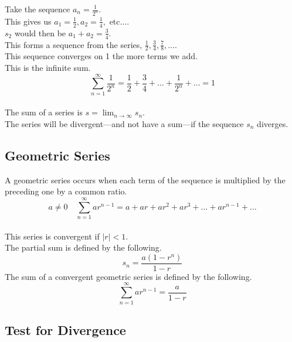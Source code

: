 \documentclass[12pt]{article}
\begin{document}
Take the sequence $a_n = \frac{1}{2^n}$.\\
This gives us $a_1 = \frac{1}{2}, a_2 = \frac{1}{4},\text{ etc}\dots$.\\
$s_2$ would then be $a_1 + a_2 = \frac{3}{4}$.\\
This forms a sequence from the series, ${\frac{1}{2}, \frac{3}{4}, \frac{7}{8}, \dots}$.\\
This sequence converges on 1 the more terms we add.\\
This is the infinite sum.\\
\begin{displaymath}
\sum_{n=1}^{\infty} \frac{1}{2^n} = \frac{1}{2} + \frac{3}{4} + \dots + \frac{1}{2^n} + \dots = 1
\end{displaymath}
\\
The sum of a series is $s = \lim_{n\to\infty} s_n$.\\
The series will be divergent---and not have a sum---if the sequence ${s_n}$ diverges.


\subsection{Geometric Series}

A geometric series occurs when each term of the sequence is multiplied by the preceding one by a common ratio.\\
\begin{displaymath}
a \neq 0 \quad \sum_{n=1}^{\infty} ar^{n-1} = a + ar + ar^2 + ar^3 + \dots + ar^{n-1} + \dots
\end{displaymath}
\\
This series is convergent if $\left|r\right| < 1$.\\
The partial sum is defined by the following.\\
\begin{displaymath}
s_n = \frac{a(1 - r^n)}{1 - r}
\end{displaymath}
The sum of a convergent geometric series is defined by the following.\\
\begin{displaymath}
\sum_{n=1}^{\infty} ar^{n-1} = \frac{a}{1-r}
\end{displaymath}


\subsection{Test for Divergence}
\end{document}
